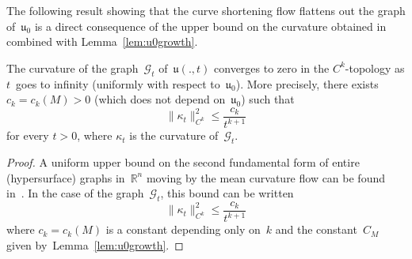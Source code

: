 \documentclass[AHL,Unicode,longabstracts,published]{cedram}
\newcommand{\GG}{\mathcal{G}}
\newcommand{\Z}{\mathbb{Z}}
\newcommand{\R}{\mathbb{R}}
\newcommand{\bu}{\mathfrak{u}}
\begin{document}
The following result showing that the curve shortening flow flattens out the graph of~$\bu_0$ is a direct consequence of the upper bound on the curvature obtained in~\cite[Proposition~4.4]{EH89} combined with Lemma~\ref{lem:u0growth}.


\begin{lemm}\label{lem:curv}
The curvature of the graph~$\GG_t$ of~$\bu(.,t)$ converges to zero in the $C^k$-topology as $t$~goes to infinity (uniformly with respect to~$\bu_0$). More precisely, there exists $c_k=c_k(M) >0$ (which does not depend on~$\bu_0$) such that
\[
\lVert \kappa_t \rVert_{C^k}^2 \leq \frac{c_k}{t^{k+1}}
\]
for every $t>0$, where $\kappa_t$ is the curvature of~$\GG_t$.
\end{lemm}

\begin{proof}
A uniform upper bound on the second fundamental form of entire (hypersurface) graphs in~$\R^n$ moving by the mean curvature flow can be found in~\cite[Proposition~4.4]{EH89}. In the case of the graph~$\GG_t$, this bound can be written
\[
\lVert \kappa_t \rVert_{C^k}^2 \leq \frac{c_k}{t^{k+1}}
\]
where $c_k=c_k(M)$ is a constant depending only on~$k$ and the constant~$C_M$ given by~Lemma~\ref{lem:u0growth}.
\end{proof}

\end{document}
